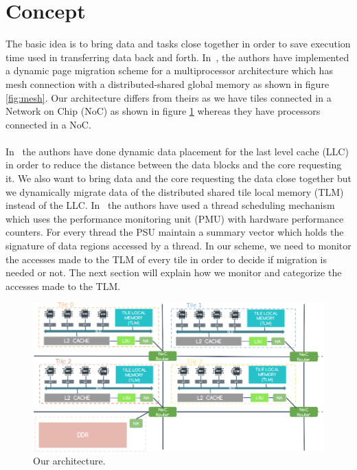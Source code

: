 \documentclass{listhesis}
\begin{document}
\section{Concept}
The basic idea is to bring data and tasks close together in order to save execution time used in transferring data back and forth. In~\cite{dynamicPageMigration}, the authors have implemented a dynamic page migration scheme for a multiprocessor architecture which has mesh connection with a distributed-shared global memory as shown in figure \ref{fig:mesh}. Our architecture differs from theirs as we have tiles connected in a Network on Chip (NoC) as shown in figure \ref{fig:processor} whereas they have processors connected in a NoC.\\
\\
In~\cite{cacheDataPlacement1, cacheDataPlacement3, cacheDataPlacement4} the authors have done dynamic data placement for the last level cache (LLC) in order to reduce the distance between the data blocks and the core requesting it. We also want to bring data and the core requesting the data close together but we dynamically migrate data of the distributed shared tile local memory (TLM) instead of the LLC. In~\cite{threadPlacement4} the authors have used a thread scheduling mechanism which uses the performance monitoring unit (PMU) with hardware performance counters. For every thread the PSU maintain a summary vector which holds the signature of data regions accessed by a thread. In our scheme, we need to monitor the accesses made to the TLM of every tile in order to decide if migration is needed or not. The next section will explain how we monitor and categorize the accesses made to the TLM. \\
\begin{figure}
  \includegraphics[width=\linewidth]{processor.png}
  \centering
  \caption{Our architecture.}
  \label{fig:processor}
\end{figure}
\end{document}

